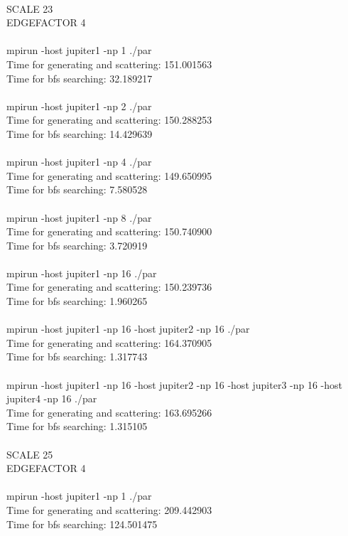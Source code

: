 \documentclass[12pt,a4paper]{article}
\begin{document}
\\
SCALE 23\\
EDGEFACTOR 4\\
\\
mpirun -host jupiter1 -np 1 ./par\\
Time for generating and scattering: 151.001563\\
Time for bfs searching: 32.189217\\
\\
mpirun -host jupiter1 -np 2 ./par\\
Time for generating and scattering: 150.288253\\
Time for bfs searching: 14.429639\\
\\
mpirun -host jupiter1 -np 4 ./par\\
Time for generating and scattering: 149.650995\\
Time for bfs searching: 7.580528\\
\\
mpirun -host jupiter1 -np 8 ./par\\
Time for generating and scattering: 150.740900\\
Time for bfs searching: 3.720919\\
\\
mpirun -host jupiter1 -np 16 ./par\\
Time for generating and scattering: 150.239736\\
Time for bfs searching: 1.960265\\
\\
mpirun -host jupiter1 -np 16 -host jupiter2 -np 16 ./par\\
Time for generating and scattering: 164.370905\\
Time for bfs searching: 1.317743\\
\\
mpirun -host jupiter1 -np 16 -host jupiter2 -np 16 -host jupiter3 -np 16 -host jupiter4 -np 16 ./par\\
Time for generating and scattering: 163.695266\\
Time for bfs searching: 1.315105\\
\\
SCALE 25\\
EDGEFACTOR 4\\
\\
mpirun -host jupiter1 -np 1 ./par\\
Time for generating and scattering: 209.442903\\
Time for bfs searching: 124.501475\\
\end{document}
